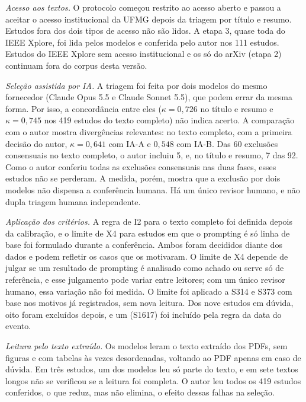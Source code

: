 \textit{Acesso aos textos.} O protocolo começou restrito ao acesso aberto e passou a aceitar o acesso institucional
da UFMG depois da triagem por título e resumo. Estudos fora dos dois tipos de acesso não são lidos. A etapa 3,
quase toda do IEEE Xplore, foi lida pelos modelos e conferida pelo autor nos 111 estudos. Estudos do IEEE Xplore
sem acesso institucional e os só do arXiv (etapa 2) continuam fora do corpus desta versão.

\textit{Seleção assistida por IA.} A triagem foi feita por dois modelos do mesmo fornecedor (Claude Opus 5.5 e Claude
Sonnet 5.5), que podem errar da mesma forma. Por isso, a concordância entre eles ($\kappa = 0{,}726$ no título e
resumo e $\kappa = 0{,}745$ nos 419 estudos do texto completo) não indica acerto. A comparação com o autor mostra
divergências relevantes: no texto completo, com a primeira decisão do autor, $\kappa = 0{,}641$ com IA-A e
$0{,}548$ com IA-B. Das 60 exclusões consensuais no
texto completo, o autor incluiu 5, e, no título e resumo, 7 das 92. Como o autor conferiu todas as exclusões
consensuais nas duas fases, esses estudos não se perderam. A medida, porém, mostra que a exclusão por dois
modelos não dispensa a conferência humana. Há um único revisor humano, e não dupla triagem humana
independente.

\textit{Aplicação dos critérios.} A regra de I2 para o texto completo foi definida depois da calibração, e o limite de
X4 para estudos em que o prompting é só linha de base foi formulado durante a conferência. Ambos foram decididos
diante dos dados e podem refletir os casos que os motivaram. O limite de X4 depende de julgar se um resultado de prompting é
analisado como achado ou serve só de referência, e esse julgamento pode variar entre leitores; com um único
revisor humano, essa variação não foi medida. O limite foi aplicado a S314 e S373 com base nos motivos já
registrados, sem nova leitura. Dos nove estudos em dúvida, oito foram excluídos depois, e um (S1617) foi incluído pela
regra da data do evento.

\textit{Leitura pelo texto extraído.} Os modelos leram o texto extraído dos PDFs, sem figuras e com tabelas às vezes
desordenadas, voltando ao PDF apenas em caso de dúvida. Em três estudos, um dos modelos leu só parte do texto, e
em sete textos longos não se verificou se a leitura foi completa. O autor leu todos os 419 estudos conferidos, o que reduz,
mas não elimina, o efeito dessas falhas na seleção.

